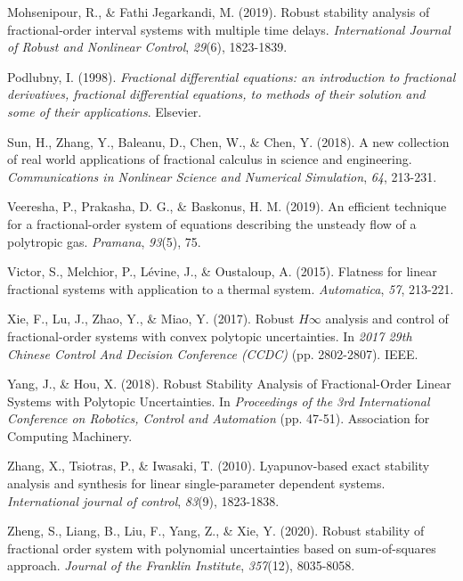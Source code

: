 \documentclass[]{interact}
\theoremstyle{plain}%
\theoremstyle{definition}
\theoremstyle{remark}
\begin{document}
\begin{thebibliography}{}
    Mohsenipour, R., \& Fathi Jegarkandi, M. (2019). Robust stability analysis of fractional‐order interval systems with multiple time delays. \emph{International Journal of Robust and Nonlinear Control}, \emph{29}(6), 1823-1839.

    Podlubny, I. (1998). \emph{Fractional differential equations: an introduction to fractional derivatives, fractional differential equations, to methods of their solution and some of their applications}. Elsevier.
    
    Sun, H., Zhang, Y., Baleanu, D., Chen, W., \& Chen, Y. (2018). A new collection of real world applications of fractional calculus in science and engineering. \emph{Communications in Nonlinear Science and Numerical Simulation}, \emph{64}, 213-231.
	
    Veeresha, P., Prakasha, D. G., \& Baskonus, H. M. (2019). An efficient technique for a fractional-order system of equations describing the unsteady flow of a polytropic gas. \emph{Pramana}, \emph{93}(5), 75.

    Victor, S., Melchior, P., L{\'e}vine, J., \& Oustaloup, A. (2015). Flatness for linear fractional systems with application to a thermal system. \emph{Automatica}, \emph{57}, 213-221.
    
    Xie, F., Lu, J., Zhao, Y., \& Miao, Y. (2017). Robust $H\infty$ analysis and control of fractional-order systems with convex polytopic uncertainties. In \emph{2017 29th Chinese Control And Decision Conference (CCDC)} (pp. 2802-2807). IEEE.
    
    Yang, J., \& Hou, X. (2018). Robust Stability Analysis of Fractional-Order Linear Systems with Polytopic Uncertainties. In \emph{Proceedings of the 3rd International Conference on Robotics, Control and Automation} (pp. 47-51). Association for Computing Machinery.
    
   Zhang, X., Tsiotras, P., \& Iwasaki, T. (2010). Lyapunov-based exact stability analysis and synthesis for linear single-parameter dependent systems. \emph{International journal of control}, \emph{83}(9), 1823-1838.
   
   Zheng, S., Liang, B., Liu, F., Yang, Z., \& Xie, Y. (2020). Robust stability of fractional order system with polynomial uncertainties based on sum-of-squares approach. \emph{Journal of the Franklin Institute}, \emph{357}(12), 8035-8058. 
   

   
\end{thebibliography}
\end{document}
